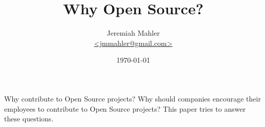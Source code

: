 \documentclass{article}
\begin{document}
\nocite{amazoncompcust}
\nocite{opensourceabuse}
\nocite{doi:10.1287/orsc.2018.1202}
\nocite{hiddenbenefit}
\nocite{enterpriseoss}
\nocite{raymond2001cathedral}
\nocite{rosen2004osl}
\nocite{wikiscovsibm}
\nocite{linus2014sievers}

\title{Why Open Source?}
\author{
	\Large{Jeremiah Mahler}\\
	\small{\href{mailto:jmmahler@gmail.com}{\textless jmmahler@gmail.com\textgreater}}
}
\date{\today}
\maketitle

\thispagestyle{empty}

Why contribute to Open Source projects?
Why should companies encourage their employees to contribute to
Open Source projects?
This paper tries to answer these questions.

\clearpage
\printbibliography[heading=bibintoc]
\end{document}
